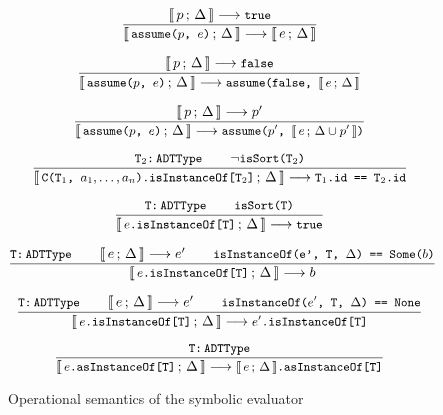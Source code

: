 \begin{figure}[htb]
\begin{framed}
\begin{equation}
\dfrac{
  \llbracket\, p\,;\, \Delta\, \rrbracket \longrightarrow \texttt{\small{true}}
}{
  \llbracket\, \texttt{\small{assume($p$, $e$)}}\,;\, \Delta\, \rrbracket \longrightarrow \llbracket\, e\,;\, \Delta\, \rrbracket
}
\end{equation}

\begin{equation}
\dfrac{
  \llbracket\, p\,;\, \Delta\, \rrbracket \longrightarrow \texttt{\small{false}}
}{
  \llbracket\, \texttt{\small{assume($p$, $e$)}}\,;\, \Delta\, \rrbracket \longrightarrow
  \texttt{\small{assume(false, $\llbracket\, e\,;\, \Delta\, \rrbracket$}}
}
\end{equation}

\begin{equation}
\dfrac{
  \llbracket\, p\,;\, \Delta\, \rrbracket \longrightarrow p'
}{
  \llbracket\, \texttt{\small{assume($p$, $e$)}}\,;\, \Delta\, \rrbracket \longrightarrow
  \texttt{\small{assume($p'$, $\llbracket\, e\,;\, \Delta \cup p'\, \rrbracket$)}}
}
\end{equation}

\begin{equation}
\dfrac{
  \texttt{\small{T$_2$:\,ADTType}} \qquad
  \neg \texttt{\small{isSort(T$_2$)}}
}{
  \llbracket\, \texttt{\small{C(T$_1$, $a_1, \ldots, a_n$).isInstanceOf[T$_2$]}}\,;\, \Delta\, \rrbracket
  \longrightarrow \texttt{\small{T$_1$.id == T$_2$.id}}
}
\end{equation}

\begin{equation}
\dfrac{
  \texttt{\small{T:\,ADTType}} \qquad
  \texttt{\small{isSort(T)}}
}{
  \llbracket\, \texttt{\small{$e$.isInstanceOf[T]}}\,;\, \Delta\, \rrbracket \longrightarrow \texttt{\small{true}}
}
\end{equation}

\begin{equation}
\dfrac{
  \texttt{\small{T:\,ADTType}} \qquad
  \llbracket\, e\,;\, \Delta\, \rrbracket \longrightarrow e' \qquad
  \texttt{\small{isInstanceOf(e', T, $\Delta$) == Some($b$)}}
}{
  \llbracket\, \texttt{\small{$e$.isInstanceOf[T]}}\,;\, \Delta\, \rrbracket \longrightarrow b
}
\end{equation}

\begin{equation}
\dfrac{
  \texttt{\small{T:\,ADTType}} \qquad
  \llbracket\, e\,;\, \Delta\, \rrbracket \longrightarrow e' \qquad
  \texttt{\small{isInstanceOf($e'$, T, $\Delta$) == None}}
}{
  \llbracket\, \texttt{\small{$e$.isInstanceOf[T]}}\,;\, \Delta\, \rrbracket \longrightarrow \texttt{\small{$e'$.isInstanceOf[T]}}
}
\end{equation}

\begin{equation}
\dfrac{
  \texttt{\small{T:\,ADTType}}
}{
  \llbracket\, \texttt{\small{$e$.asInstanceOf[T]}}\,;\, \Delta\, \rrbracket \longrightarrow \texttt{\small{$\llbracket\, e\,;\, \Delta\, \rrbracket$.asInstanceOf[T]}}
}
\end{equation}

\end{framed}
\vspace{-10pt}
\caption{Operational semantics of the symbolic evaluator \label{fig:symbolicsem}}
\end{figure}

